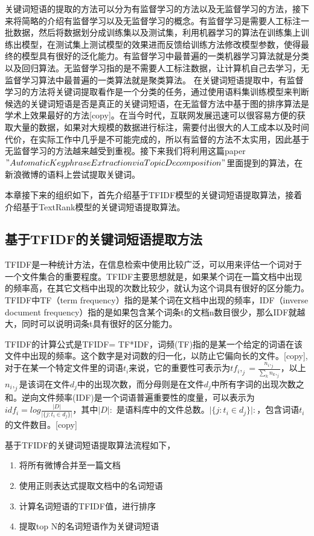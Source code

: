 \documentclass[master]{njuthesis}
\begin{document}
关键词短语的提取的方法可以分为有监督学习的方法以及无监督学习的方法，接下来将简略的介绍有监督学习以及无监督学习的概念。有监督学习是需要人工标注一批数据，然后将数据划分成训练集以及测试集，利用机器学习的算法在训练集上训练出模型，在测试集上测试模型的效果进而反馈给训练方法修改模型参数，使得最终的模型具有很好的泛化能力。有监督学习中最普遍的一类机器学习算法就是分类以及回归算法。无监督学习指的是不需要人工标注数据，让计算机自己去学习，无监督学习算法中最普遍的一类算法就是聚类算法。
在关键词短语提取中，有监督学习的方法将关键词提取看作是一个分类的任务，通过使用语料集训练模型来判断候选的关键词短语是否是真正的关键词短语，在无监督方法中基于图的排序算法是学术上效果最好的方法[copy]。在当今时代，互联网发展迅速可以很容易方便的获取大量的数据，如果对大规模的数据进行标注，需要付出很大的人工成本以及时间代价，在实际工作中几乎是不可能完成的，所以有监督的方法不太实用，因此基于无监督学习的方法越来越受到重视。接下来我们将利用这篇paper$"Automatic Keyphrase Extraction via Topic Decomposition"$里面提到的算法，在新浪微博的语料上尝试提取关键词。

本章接下来的组织如下，首先介绍基于TFIDF模型的关键词短语提取算法，接着介绍基于TextRank模型的关键词短语提取算法。

\subsection{基于TFIDF的关键词短语提取方法}

TFIDF是一种统计方法，在信息检索中使用比较广泛，可以用来评估一个词对于一个文件集合的重要程度。TFIDF主要思想就是，如果某个词在一篇文档中出现的频率高，在其它文档中出现的次数比较少，就认为这个词具有很好的区分能力。TFIDF中TF（term frequency）指的是某个词在文档中出现的频率，IDF（inverse document frequency）指的是如果包含某个词条t的文档n数目很少，那么IDF就越大，同时可以说明词条t具有很好的区分能力。

TFIDF的计算公式是TFIDF= TF*IDF，词频(TF)指的是某一个给定的词语在该文件中出现的频率。这个数字是对词数的归一化，以防止它偏向长的文件。[copy],对于在某一个特定文件里的词语$t_i$来说，它的重要性可表示为$tf_i,_j = \frac{n_i,_j}{\sum_{k} n_k,_j}$，以上$n_i,_j$是该词在文件$d_j$中的出现次数，而分母则是在文件$d_j$中所有字词的出现次数之和。逆向文件频率(IDF)是一个词语普遍重要性的度量，可以表示为$idf_i = log\frac{\vert D \vert}{\vert \{j:t_i \in d_j \}\vert}$，其中$\vert D \vert:$ 是语料库中的文件总数。$\vert\{ j:t_i \in d_j\}\vert:$，包含词语$t_i$的文件数目。[copy]

基于TFIDF的关键词短语提取算法流程如下，

\begin{enumerate}
\item 将所有微博合并至一篇文档
\item 使用正则表达式提取文档中的名词短语
\item 计算名词短语的TFIDF值，进行排序
\item 提取top N的名词短语作为关键词短语
\end{enumerate}
\end{document}
